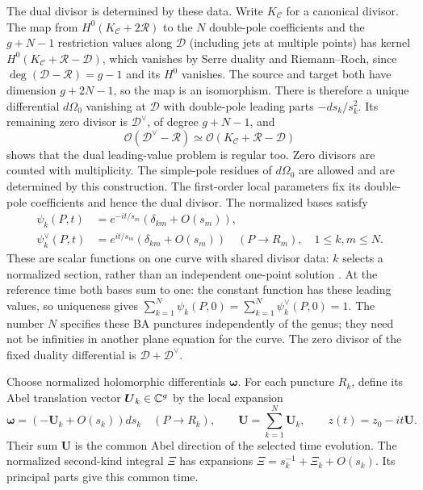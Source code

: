 The dual divisor is determined by these data. Write $K_{\mathcal C}$
for a canonical divisor. The map from
$H^0(K_{\mathcal C}+2\mathscr R)$ to the $N$ double-pole coefficients and the
$g+N-1$ restriction values along $\mathscr D$ (including jets at
multiple points) has kernel
$H^0(K_{\mathcal C}+\mathscr R-\mathscr D)$, which vanishes by Serre duality
and Riemann--Roch, since $\deg(\mathscr D-\mathscr R)=g-1$ and its $H^0$
vanishes. The source and target both have dimension $g+2N-1$, so the map is an isomorphism.
There is therefore a unique differential $d\Omega_0$ vanishing at
$\mathscr D$ with double-pole leading parts $-ds_k/s_k^2$.
Its remaining zero divisor is $\mathscr D^\vee$, of degree $g+N-1$,
and
\[
 \mathcal O(\mathscr D^\vee-\mathscr R)
 \simeq\mathcal O(K_{\mathcal C}+\mathscr R-\mathscr D)
\]
shows that the dual leading-value problem is regular too.
Zero divisors are counted with multiplicity. The simple-pole residues
of $d\Omega_0$ are
allowed and are determined by this construction. The first-order
local parameters fix its double-pole coefficients and hence the
dual divisor. The normalized bases satisfy
\begin{equation}\label{eq:general-BA-asymptotics}
\begin{aligned}
 \psi_k(P,t)&=e^{-it/s_m}(\delta_{km}+O(s_m)),\\
 \psi_k^\vee(P,t)&=e^{it/s_m}(\delta_{km}+O(s_m))
 \quad(P\to R_m),\quad1\leq k,m\leq N.
\end{aligned}
\end{equation}
These are scalar functions on one curve with shared divisor data:
$k$ selects a normalized section, rather than an independent one-point
solution \cite{Krichever1977,KricheverShiota2011}.
At the reference time both bases sum to one: the constant function
has these leading values, so uniqueness gives
$\sum_{k=1}^{N}\psi_k(P,0)=\sum_{k=1}^{N}\psi_k^\vee(P,0)=1$.
The number $N$ specifies these BA punctures independently of the genus;
they need not be infinities in another plane equation for the curve.
The zero divisor of the fixed duality differential is
$\mathscr D+\mathscr D^\vee$.

Choose normalized holomorphic differentials $\boldsymbol\omega$.
For each puncture $R_k$, define its Abel translation vector
$\boldsymbol U_k\in\mathbb C^g$ by the local expansion
\begin{equation}\label{eq:multipoint-Abel-direction}
 \boldsymbol\omega=(-\boldsymbol U_k+O(s_k))ds_k\quad(P\to R_k),
 \qquad \boldsymbol U=\sum_{k=1}^{N}\boldsymbol U_k,\qquad
 z(t)=z_0-it\boldsymbol U.
\end{equation}
Their sum $\boldsymbol U$ is the common Abel direction of the selected
time evolution. The normalized second-kind integral $\Xi$ has expansions
$\Xi=s_k^{-1}+\Xi_k+O(s_k)$. Its principal parts give this common time.

